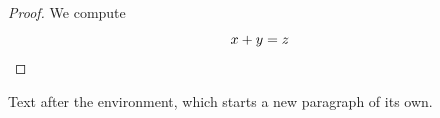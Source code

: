 \documentclass{article}
\begin{document}
\begin{proof}
We compute
\[
  x + y = z \qedhere
\]
\end{proof}
Text after the environment, which starts a new paragraph of its own.
\end{document}
